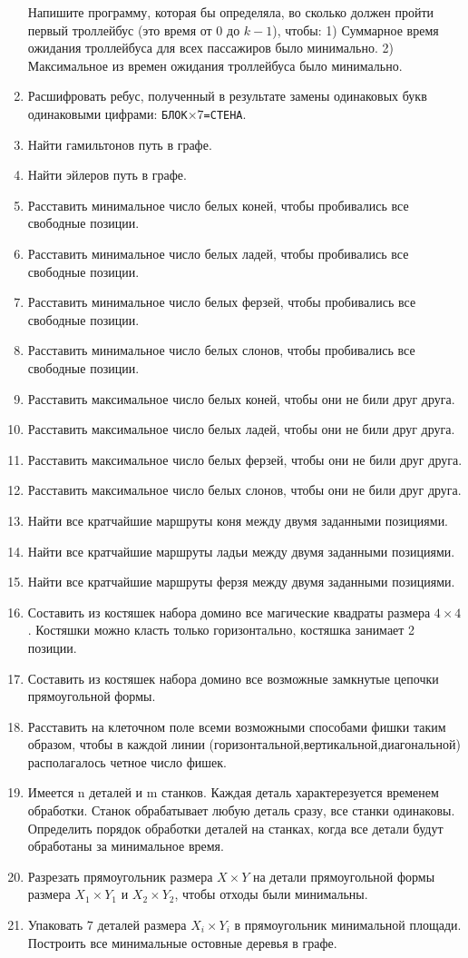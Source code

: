 \documentclass[12pt, openany, twoside]{book} %
\begin{document}
\begin{enumerate}
Напишите программу, которая бы определяла, во сколько должен пройти
первый троллейбус (это время от $0$ до $k-1$), чтобы:
1) Суммарное время ожидания троллейбуса для всех пассажиров было минимально.
2) Максимальное из времен ожидания троллейбуса было минимально.
\item Расшифровать ребус, полученный в результате замены одинаковых букв
одинаковыми цифрами: \texttt{БЛОК$\times 7$=СТЕНА}.
\item Найти гамильтонов путь в графе.
\item Найти эйлеров путь в графе.
\item Расставить минимальное число белых коней, чтобы пробивались все свободные позиции.
\item Расставить минимальное число белых ладей, чтобы пробивались все свободные позиции.
\item Расставить минимальное число белых ферзей, чтобы пробивались все свободные позиции.
\item Расставить минимальное число белых слонов, чтобы пробивались все свободные позиции.
\item Расставить максимальное число белых коней, чтобы они не били друг друга.
\item Расставить максимальное число белых ладей, чтобы они не били друг друга.
\item Расставить максимальное число белых ферзей, чтобы они не били друг друга.
\item Расставить максимальное число белых слонов, чтобы они не били друг друга.
\item Найти все кратчайшие маршруты коня между двумя заданными позициями.
\item Найти все кратчайшие маршруты ладьи между двумя заданными позициями.
\item Найти все кратчайшие маршруты ферзя между двумя заданными позициями.
\item Составить из костяшек набора домино все магические квадраты размера $4\times 4$. Костяшки можно класть только горизонтально, костяшка занимает 2 позиции.
\item Составить из костяшек набора домино все возможные замкнутые цепочки прямоугольной формы.
\item Расставить на клеточном поле всеми возможными способами фишки таким образом, чтобы в каждой линии (горизонтальной,вертикальной,диагональной) располагалось четное число фишек.
\item Имеется n деталей и m станков. Каждая деталь характерезуется временем обработки. Станок обрабатывает любую деталь сразу, все станки одинаковы. Определить порядок обработки деталей на станках, когда все детали будут обработаны за минимальное время.
\item Разрезать прямоугольник размера $X\times Y$ на детали прямоугольной формы размера $X_1\times Y_1$ и $X_2 \times Y_2$, чтобы отходы были минимальны.
\item Упаковать $7$ деталей размера $X_i \times Y_i$ в прямоугольник минимальной площади.
Построить все минимальные остовные деревья в графе.
\end{enumerate}
\end{document}
